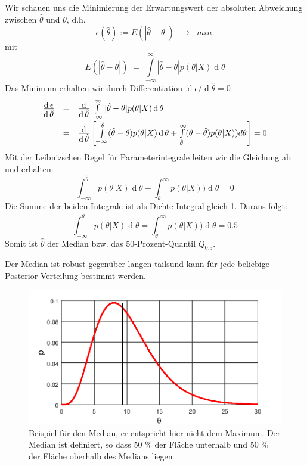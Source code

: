Wir schauen uns die Minimierung der Erwartungswert der absoluten Abweichung zwischen 
$\hat{\theta}$ und $\theta$, d.h.  
\[
\epsilon(\hat{\theta}) := E(|\hat{\theta}-\theta|)
\;\; \rightarrow \;\; min.
\]
mit 
\[
E(|\hat{\theta}-\theta|) \; = \; \int\limits_{-\infty}^{\infty} |\hat{\theta}-\theta | p(\theta|X) \operatorname d \theta 
\]
Das Minimum erhalten wir durch Differentiation $\operatorname d \epsilon / \operatorname d \hat{\theta} = 0$
\[
\begin{array}{rcl}
\frac{\textstyle \operatorname d \epsilon}{\textstyle \operatorname d \hat{\theta}} &=& 
\frac{\textstyle \operatorname d}{\textstyle \operatorname d \hat{\theta}} 
\int\limits_{-\infty}^{\infty} |\hat{\theta}-\theta | p(\theta|X) \operatorname d \theta \\[2ex]
&=&\frac{\textstyle \operatorname d}{\textstyle \operatorname d \hat{\theta}} \left[\int\limits_{-\infty}^{\hat{\theta}}(\hat{\theta}-\theta) p(\theta |X) \operatorname d \theta 
+\int\limits_{\hat{\theta}}^{\infty} (\theta -\hat{\theta}) p(\theta|X))d \theta
\right] = 0
\end{array}
\]
Mit der Leibnizschen Regel für Parameterintegrale leiten wir die Gleichung
ab und erhalten: 
\[
\int_{-\infty}^{\hat{\theta}} p(\theta |X) \operatorname d \theta 
- \int_{\hat{\theta}}^{\infty} p(\theta|X)) \operatorname d \theta
= 0
\]
Die Summe der beiden Integrale ist als Dichte-Integral gleich 1. 
Daraus folgt: 
\[
\int_{-\infty}^{\hat{\theta}} p(\theta |X) \operatorname d \theta 
= \int_{\hat{\theta}}^{\infty} p(\theta|X)) \operatorname d \theta
= 0.5
\]
Somit ist $\hat{\theta}$ der Median bzw. das 50-Prozent-Quantil $Q_{0.5}$.

Der Median ist robust gegenüber langen \glqq tails\grqq und kann für 
jede beliebige Posterior-Verteilung bestimmt werden. 

\begin{figure}[!htb]
	\begin{center}
	  \includegraphics[width=120mm] 
		{08_vorlesung/media/Plot_Median.png}
		\caption{Beispiel für den Median, er entspricht hier nicht dem 
			Maximum. Der Median ist definiert, so dass 50 \% der Fläche unterhalb und 50 \%
		der Fläche oberhalb des Medians liegen}
	\label{fig:Median}
	\end{center}
\end{figure}

